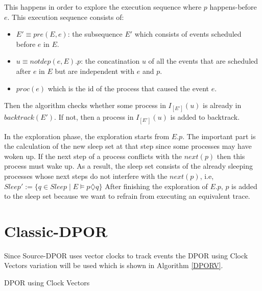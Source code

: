 This happens in order to explore the execution sequence where $p$ happens-before $e$.
This execution sequence consists of:
\begin{itemize} 
\item $E' \equiv pre(E,e)$: the subsequence $E'$ which consists of events scheduled before $e$ in $E$.
\item $u \equiv notdep(e,E).p$: the concatination $u$ of all the events that are scheduled after $e$ in $E$ but are independent with $e$ and $p$.
\item $proc(e)$ which is the id of the process that caused the event $e$.
\end{itemize}
Then the algorithm checks whether some process in $I_{[E']}(u)$ is already in $backtrack(E')$. 
If not, then a process in $I_{[E']}(u)$ is added to backtrack. 

In the exploration phase, the exploration starts from $E.p$. The important part is the calculation of the new sleep set at that step since some processes 
may have woken up.
If the next step of a process conflicts with the $next(p)$ then this process must wake up. As a result, the sleep set consists of the already sleeping processes
whose next steps do not interfere with the $next(p)$, i.e, $Sleep' := \{q \in Sleep \mid E \models p \diamondsuit q \} $ 
After finishing the exploration of $E.p$, $p$ is added to the sleep set because we want to refrain from executing an equivalent trace.

\section{Classic-DPOR}

Since Source-DPOR uses vector clocks to track events the DPOR using Clock Vectors \cite{FlanaganDPOR} variation will be used which is shown in Algorithm \ref{DPORV}.

\begin{algorithm}
    \caption{DPOR using Clock Vectors}
    \label{DPORV}
\end{algorithm}

